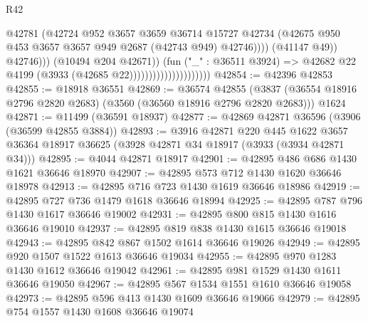 \begin{lexlean}{R42}
\begin{coremodule}
                                                      @42781
                                                      (@42724
                                                        @952
                                                        @3657
                                                        @3659
                                                        @36714
                                                        @15727
                                                        @42734
                                                        (@42675
                                                          @950
                                                          @453
                                                          @3657
                                                          @3657
                                                          @949
                                                          @2687
                                                          (@42743 @949)
                                                          @42746))))
                                                  (@41147 @49))
                                                @42746)))
                                          (@10494 @204 @42671))
                                        (fun ("_" : @36511 @3924) =>
                                        @42682 @22 @4199 (@3933 (@42685 @22)))))))))))))))))))))
@42854 := @42396 @42853
@42855 := @18918 @36551
@42869 := @36574
    @42855
    (@3837 (@36554 @18916 @2796 @2820 @2683) (@3560 (@36560 @18916 @2796 @2820 @2683)))
    @1624
@42871 := @11499 (@36591 @18937)
@42877 := @42869 @42871 @36596 (@3906 (@36599 @42855 @3884))
@42893 := @3916
    @42871
    @220
    @445
    @1622
    @3657
    @36364
    @18917
    @36625
    (@3928 @42871 @34 @18917 (@3933 (@3934 @42871 @34)))
@42895 := @4044 @42871 @18917
@42901 := @42895 @486 @686 @1430 @1621 @36646 @18970
@42907 := @42895 @573 @712 @1430 @1620 @36646 @18978
@42913 := @42895 @716 @723 @1430 @1619 @36646 @18986
@42919 := @42895 @727 @736 @1479 @1618 @36646 @18994
@42925 := @42895 @787 @796 @1430 @1617 @36646 @19002
@42931 := @42895 @800 @815 @1430 @1616 @36646 @19010
@42937 := @42895 @819 @838 @1430 @1615 @36646 @19018
@42943 := @42895 @842 @867 @1502 @1614 @36646 @19026
@42949 := @42895 @920 @1507 @1522 @1613 @36646 @19034
@42955 := @42895 @970 @1283 @1430 @1612 @36646 @19042
@42961 := @42895 @981 @1529 @1430 @1611 @36646 @19050
@42967 := @42895 @567 @1534 @1551 @1610 @36646 @19058
@42973 := @42895 @596 @413 @1430 @1609 @36646 @19066
@42979 := @42895 @754 @1557 @1430 @1608 @36646 @19074

\end{coremodule}
\end{lexlean}
